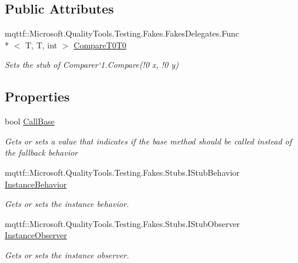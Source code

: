 \subsection*{Public Attributes}
\begin{DoxyCompactItemize}
\item 
mqttf\-::\-Microsoft.\-Quality\-Tools.\-Testing.\-Fakes.\-Fakes\-Delegates.\-Func\\*
$<$ T, T, int $>$ \hyperlink{class_system_1_1_collections_1_1_generic_1_1_fakes_1_1_stub_comparer_3_01_t_01_4_a524a5395e70bdad2c4145d97bf6c43b7}{Compare\-T0\-T0}
\begin{DoxyCompactList}\small\item\em Sets the stub of Comparer`1.Compare(!0 x, !0 y)\end{DoxyCompactList}\end{DoxyCompactItemize}
\subsection*{Properties}
\begin{DoxyCompactItemize}
\item 
bool \hyperlink{class_system_1_1_collections_1_1_generic_1_1_fakes_1_1_stub_comparer_3_01_t_01_4_a373232d662c7a8f9981e211ed89b3533}{Call\-Base}
\begin{DoxyCompactList}\small\item\em Gets or sets a value that indicates if the base method should be called instead of the fallback behavior\end{DoxyCompactList}\item 
mqttf\-::\-Microsoft.\-Quality\-Tools.\-Testing.\-Fakes.\-Stubs.\-I\-Stub\-Behavior \hyperlink{class_system_1_1_collections_1_1_generic_1_1_fakes_1_1_stub_comparer_3_01_t_01_4_adba214d694e3db6f223903153a7d7902}{Instance\-Behavior}
\begin{DoxyCompactList}\small\item\em Gets or sets the instance behavior.\end{DoxyCompactList}\item 
mqttf\-::\-Microsoft.\-Quality\-Tools.\-Testing.\-Fakes.\-Stubs.\-I\-Stub\-Observer \hyperlink{class_system_1_1_collections_1_1_generic_1_1_fakes_1_1_stub_comparer_3_01_t_01_4_a1917545232137e19036d26136cda3460}{Instance\-Observer}
\begin{DoxyCompactList}\small\item\em Gets or sets the instance observer.\end{DoxyCompactList}\end{DoxyCompactItemize}


